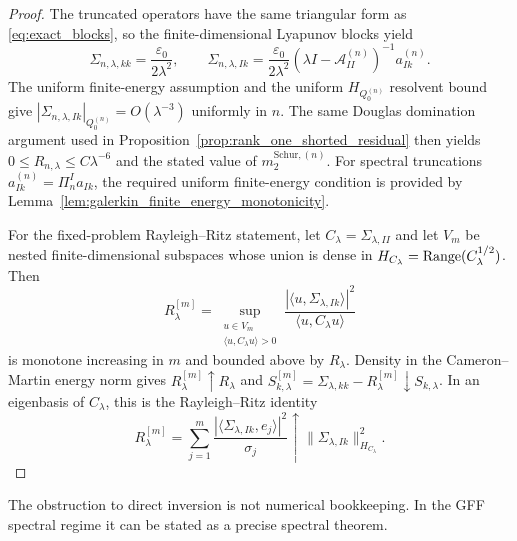 \begin{proof}
The truncated operators have the same triangular form as
\eqref{eq:exact_blocks}, so the finite-dimensional Lyapunov blocks yield
\[
  \Sigma_{n,\lambda,kk}=\frac{\varepsilon_0}{2\lambda^2},
  \qquad
  \Sigma_{n,\lambda,Ik}
  =
  \frac{\varepsilon_0}{2\lambda^2}
  (\lambda I-\mathcal{A}_{II}^{(n)})^{-1}a_{Ik}^{(n)}.
\]
The uniform finite-energy assumption and the uniform $H_{Q_0^{(n)}}$ resolvent
bound give
$|\Sigma_{n,\lambda,Ik}|_{Q_0^{(n)}}=O(\lambda^{-3})$ uniformly in $n$.
The same Douglas domination argument used in
Proposition~\ref{prop:rank_one_shorted_residual} then yields
$0\le R_{n,\lambda}\le C\lambda^{-6}$ and the stated value of
$m_2^{\mathrm{Schur},(n)}$.  For spectral truncations
$a_{Ik}^{(n)}=\Pi_n^I a_{Ik}$, the required uniform finite-energy condition is
provided by Lemma~\ref{lem:galerkin_finite_energy_monotonicity}.

For the fixed-problem Rayleigh--Ritz statement, let
$C_\lambda=\Sigma_{\lambda,II}$ and let $V_m$ be nested finite-dimensional
subspaces whose union is dense in $H_{C_\lambda}=\operatorname{Range}(C_\lambda^{1/2})$.
Then
\[
  R_\lambda^{[m]}
  =
  \sup_{\substack{u\in V_m\\ \langle u,C_\lambda u\rangle>0}}
  \frac{|\langle u,\Sigma_{\lambda,Ik}\rangle|^2}
       {\langle u,C_\lambda u\rangle}
\]
is monotone increasing in $m$ and bounded above by $R_\lambda$.  Density in the
Cameron--Martin energy norm gives $R_\lambda^{[m]}\uparrow R_\lambda$ and
$S_{k,\lambda}^{[m]}=\Sigma_{\lambda,kk}-R_\lambda^{[m]}\downarrow
S_{k,\lambda}$.  In an eigenbasis of $C_\lambda$, this is the Rayleigh--Ritz
identity
\[
  R_\lambda^{[m]}
  =
  \sum_{j=1}^m
  \frac{|\langle\Sigma_{\lambda,Ik},e_j\rangle|^2}{\sigma_j}
  \uparrow
  \|\Sigma_{\lambda,Ik}\|_{H_{C_\lambda}}^2.
\]
\end{proof}


The obstruction to direct inversion is not numerical bookkeeping.  In the GFF
spectral regime it can be stated as a precise spectral theorem.

